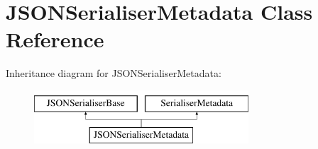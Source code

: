 \hypertarget{class_j_s_o_n_serialiser_metadata}{}\section{J\+S\+O\+N\+Serialiser\+Metadata Class Reference}
\label{class_j_s_o_n_serialiser_metadata}
Inheritance diagram for J\+S\+O\+N\+Serialiser\+Metadata\+:\begin{figure}[H]
\begin{center}
\leavevmode
\includegraphics[height=2.000000cm]{class_j_s_o_n_serialiser_metadata}
\end{center}
\end{figure}
